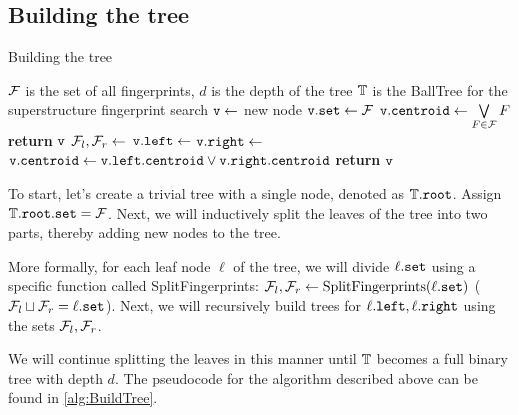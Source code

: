 \subsection{Building the tree}

\begin{algorithm}
  \caption{Building the tree} \label{alg:BuildTree}
  \begin{algorithmic}[1]
    \Require $\mathcal{F}$ is the set of all fingerprints, $d$ is the depth of the tree
    \Ensure $\mathbb{T} $ is the BallTree for the superstructure fingerprint search 
      \State ${\tt v} \gets$ new node
	\State ${\tt v.set} \gets \mathcal{F}$ 
	\State ${\tt v.centroid} \gets \bigvee\limits_{F \in \mathcal{F}} F$ 
	\State \textbf{return} ${\tt v}$ 
      \Else 
        \State $\mathcal{F}_l, \mathcal{F}_r \gets $ 
        \State ${\tt v.left} \gets $  
	\State ${\tt v.right} \gets $ 
	\State ${\tt v.centroid} \gets {\tt v.left.centroid} \lor {\tt v.right.centroid}$ 
        \State \textbf{return} ${\tt v}$ 
      \EndIf
    \EndProcedure
  \end{algorithmic}
\end{algorithm}

To start, let's create a trivial tree with a single node, denoted as $\mathbb{T}.{\tt root}$. Assign $\mathbb{T}.{\tt root.set} = \mathcal{F}$. 
Next, we will inductively split the leaves of the tree into two parts, thereby adding new nodes to the tree.

More formally, for each leaf node $\ell$ of the tree, we will divide $\ell.{\tt set}$ using a specific function called 
SplitFingerprints: $\mathcal{F}_l, \mathcal{F}_r \gets \text{SplitFingerprints}(\ell.{\tt set})$ ($\mathcal{F}_l \sqcup \mathcal{F}_r = \ell.{\tt set}$).
Next, we will recursively build trees for $\ell.{\tt left}, \ell.{\tt right}$ using the sets $\mathcal{F}_l, \mathcal{F}_r$.

We will continue splitting the leaves in this manner until $\mathbb{T}$ becomes a full binary tree with depth $d$. The pseudocode 
for the algorithm described above can be found in \ref{alg:BuildTree}.
 

